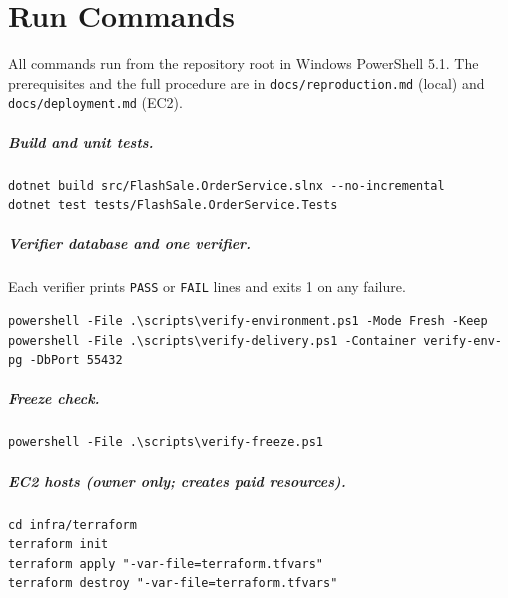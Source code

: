 \documentclass[a4paper]{report}
\begin{document}
\chapter{Run Commands}
\label{app:commands}

All commands run from the repository root in Windows PowerShell 5.1. The
prerequisites and the full procedure are in \nolinkurl{docs/reproduction.md}
(local) and \nolinkurl{docs/deployment.md} (EC2).

\paragraph{Build and unit tests.}
\begin{Verbatim}[breaklines=true,breakanywhere=true,fontsize=\footnotesize]
dotnet build src/FlashSale.OrderService.slnx --no-incremental
dotnet test tests/FlashSale.OrderService.Tests
\end{Verbatim}

\paragraph{Verifier database and one verifier.} Each verifier prints
\texttt{PASS} or \texttt{FAIL} lines and exits 1 on any failure.
\begin{Verbatim}[breaklines=true,breakanywhere=true,fontsize=\footnotesize]
powershell -File .\scripts\verify-environment.ps1 -Mode Fresh -Keep
powershell -File .\scripts\verify-delivery.ps1 -Container verify-env-pg -DbPort 55432
\end{Verbatim}

\paragraph{Freeze check.}
\begin{Verbatim}[breaklines=true,breakanywhere=true,fontsize=\footnotesize]
powershell -File .\scripts\verify-freeze.ps1
\end{Verbatim}

\paragraph{EC2 hosts (owner only; creates paid resources).}
\begin{Verbatim}[breaklines=true,breakanywhere=true,fontsize=\footnotesize]
cd infra/terraform
terraform init
terraform apply "-var-file=terraform.tfvars"
terraform destroy "-var-file=terraform.tfvars"
\end{Verbatim}
\end{document}
